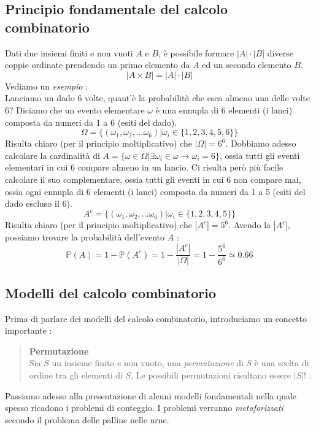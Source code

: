 \documentclass[12pt, letterpaper]{article}
\begin{document}
 \subsection{Principio fondamentale del calcolo combinatorio}
 Dati due insiemi finiti e non vuoti \(A\) e \(B\), è possibile formare \(|A|\cdot|B|\) diverse coppie ordinate 
 prendendo un primo elemento da \(A\) ed un secondo elemento \(B\).
 \begin{equation}
    |A\times B|=|A|\cdot|B|
 \end{equation}
 \newpage Vediamo un \textit{esempio} :\\
 Lanciamo un dado 6 volte, quant'è la probabilità che esca almeno una delle volte 6? Diciamo che un evento 
 elementare \(\omega\) è una ennupla di 6 elementi (i lanci) composta da numeri da 1 a 6 (esiti del dado). 
 \begin{equation}
    \Omega = \{(\omega_1,\omega_2,...\omega_6) | \omega_i \in \{1,2,3,4,5,6\}\}
 \end{equation}
 Risulta chiaro (per il principio moltiplicativo) che \(|\Omega|=6^6\).
 Dobbiamo adesso calcolare la cardinalità di \(A=\{\omega \in \Omega | \exists \omega_i \in \omega \rightarrow\omega_i = 6\}\),
 ossia tutti gli eventi elementari in cui 6 compare almeno in un lancio. Ci risulta però più facile calcolare il 
 suo complementare, ossia tutti gli eventi in cui 6 non compare mai, ossia
 ogni ennupla di 6 elementi (i lanci) composta da numeri da 1 a 5 (esiti del dado escluso il 6). 
 \begin{equation}
    A^c = \{(\omega_1,\omega_2,...\omega_6) | \omega_i \in \{1,2,3,4,5\}\}
 \end{equation}
 Risulta chiaro (per il principio moltiplicativo) che \(|A^c|=5^6\).
 Avendo la \(|A^c|\), possiamo trovare la probabilità dell'evento \(A\) : 
 \begin{equation}
    \mathbb{P}(A)=1-\mathbb{P}(A^c)=1-\dfrac{|A^c|}{|\Omega|}=1-\dfrac{5^6}{6^6}\simeq 0.66
 \end{equation}
 \subsection{Modelli del calcolo combinatorio}
 Prima di parlare dei modelli del calcolo combinatorio, introduciamo un concetto importante :
 \begin{quote}
    \textbf{Permutazione}\\
    Sia \(S\) un insieme finito e non vuoto, una \textit{permutazione} di \(S\) è 
    una scelta di ordine tra gli elementi di \(S\). Le possibili permutazioni risultano essere \(|S|!\) .
 \end{quote}
 Passiamo adesso alla presentazione di alcuni modelli fondamentali nella quale spesso ricadono i problemi 
 di conteggio. I problemi verranno \textit{metaforizzati} secondo il problema delle palline nelle urne.
\end{document}
